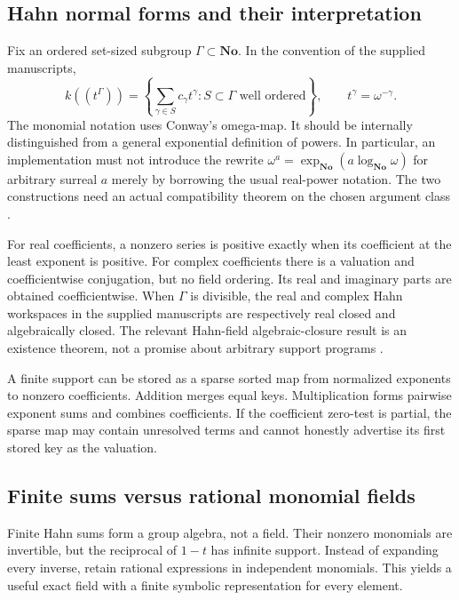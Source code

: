 \documentclass[11pt,letterpaper]{article}
\theoremstyle{definition}\newtheorem{definition}[theorem]{Definition}
\theoremstyle{remark}\newtheorem{remark}[theorem]{Remark}
\newcommand{\No}{\mathbf{No}}\newcommand{\SC}{\mathbf{SC}}
\numberwithin{equation}{section}\setcounter{tocdepth}{2}
\begin{document}
\subsection{Hahn normal forms and their interpretation}
Fix an ordered set-sized subgroup $\Gamma\subset\No$. In the convention of the supplied manuscripts,
\begin{equation}\label{eq:hahn}
 k((t^\Gamma))=\left\{\sum_{\gamma\in S}c_\gamma t^\gamma:
 S\subset\Gamma\text{ well ordered}\right\},\qquad
 t^\gamma=\omega^{-\gamma}.
\end{equation}
The monomial notation uses Conway's omega-map. It should be internally distinguished from a general exponential definition of powers. In particular, an implementation must not introduce the rewrite $\omega^a=\exp_{\No}(a\log_{\No}\omega)$ for arbitrary surreal $a$ merely by borrowing the usual real-power notation. The two constructions need an actual compatibility theorem on the chosen argument class \cite{Gonshor,SA}.

For real coefficients, a nonzero series is positive exactly when its coefficient at the least exponent is positive. For complex coefficients there is a valuation and coefficientwise conjugation, but no field ordering. Its real and imaginary parts are obtained coefficientwise. When $\Gamma$ is divisible, the real and complex Hahn workspaces in the supplied manuscripts are respectively real closed and algebraically closed. The relevant Hahn-field algebraic-closure result is an existence theorem, not a promise about arbitrary support programs \cite{Poonen}.

A finite support can be stored as a sparse sorted map from normalized exponents to nonzero coefficients. Addition merges equal keys. Multiplication forms pairwise exponent sums and combines coefficients. If the coefficient zero-test is partial, the sparse map may contain unresolved terms and cannot honestly advertise its first stored key as the valuation.

\subsection{Finite sums versus rational monomial fields}
Finite Hahn sums form a group algebra, not a field. Their nonzero monomials are invertible, but the reciprocal of $1-t$ has infinite support. Instead of expanding every inverse, retain rational expressions in independent monomials. This yields a useful exact field with a finite symbolic representation for every element.
\end{document}
